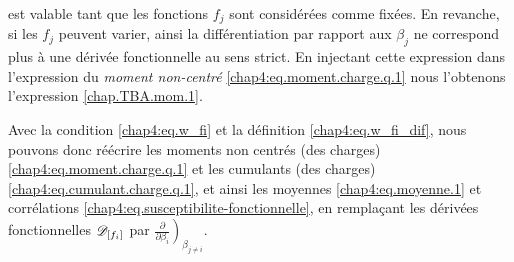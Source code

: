 est valable tant que les fonctions $f_j$ sont considérées comme fixées. En revanche, si les $f_j$ peuvent varier, ainsi la différentiation par rapport aux $\beta_j$ ne correspond plus à une dérivée fonctionnelle au sens strict.
En injectant cette expression dans l'expression du {\em moment non-centré} \eqref{chap4:eq.moment.charge.q.1} nous l'obtenons l'expression \eqref{chap.TBA.mom.1}. %

\medskip

Avec la condition \eqref{chap4:eq.w_fi} et la définition \eqref{chap4:eq.w_fi_dif}, nous pouvons donc réécrire les moments non centrés (des charges) \eqref{chap4:eq.moment.charge.q.1} et les cumulants (des charges) \eqref{chap4:eq.cumulant.charge.q.1}, et ainsi les moyennes \eqref{chap4:eq.moyenne.1} et corrélations \eqref{chap4:eq.susceptibilite-fonctionnelle}, en remplaçant les dérivées fonctionnelles $\mathscr{D}_{[f_i]}$ par $\left. \frac{ \partial}{ \partial \beta_i } \right)_{\beta_{j\neq i}}$.

